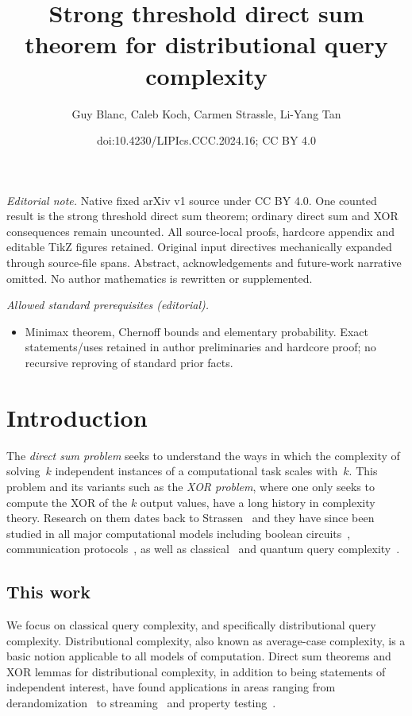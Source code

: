 \documentclass[11pt]{article}
\title{Strong threshold direct sum theorem for distributional query complexity}
\author{Guy Blanc, Caleb Koch, Carmen Strassle, Li-Yang Tan}
\date{doi:10.4230/LIPIcs.CCC.2024.16; CC BY 4.0}
\begin{document}
\maketitle
\noindent\textit{Editorial note.} Native fixed arXiv v1 source under CC BY 4.0. One counted result is the strong threshold direct sum theorem; ordinary direct sum and XOR consequences remain uncounted. All source-local proofs, hardcore appendix and editable TikZ figures retained. Original input directives mechanically expanded through source-file spans. Abstract, acknowledgements and future-work narrative omitted. No author mathematics is rewritten or supplemented.\par\medskip
\noindent\textit{Allowed standard prerequisites (editorial).}\begin{itemize}
\item Minimax theorem, Chernoff bounds and elementary probability. Exact statements/uses retained in author preliminaries and hardcore proof; no recursive reproving of standard prior facts.
\end{itemize}\medskip
\section{Introduction}


The {\sl direct sum problem} seeks to understand the ways in which the complexity of solving~$k$ independent instances of a computational task scales with~$k$. This problem and its variants such as the {\sl XOR problem}, where one only seeks to compute the XOR of the $k$ output values, have a long history in complexity theory.  Research on them dates back to Strassen~\cite{Str73} and they have since been  studied in all major computational models including boolean circuits~\cite{Yao82,Lev85,GNW11,Imp95,IW97,OD02,IJKW08,Dru13}, communication protocols~\cite{IRW94,Sha04,KSdW07,LSS08,VW08,Kla10,She11,Jai15,JPY12,BBCR10,BRWY13,Yu22}, as well as classical~\cite{IRW94,NRS94,Sha04,KSdW07,Dru12,BDK18,BB19,BKLS23,Hoza23} and quantum query complexity~\cite{ASdW06,KSdW07,Spa08,She11,AMRR11,LR13}. 

\subsection{This work} 

We focus on classical query complexity, and specifically distributional query complexity. Distributional complexity, also known as average-case complexity, is a basic notion applicable to all models of computation. Direct sum theorems and XOR lemmas for distributional complexity, in addition to being statements of independent interest, have found applications in areas ranging from derandomization~\cite{Yao82,NW94,IW97} to streaming~\cite{AN21} and property testing~\cite{BKST23}.
\end{document}
